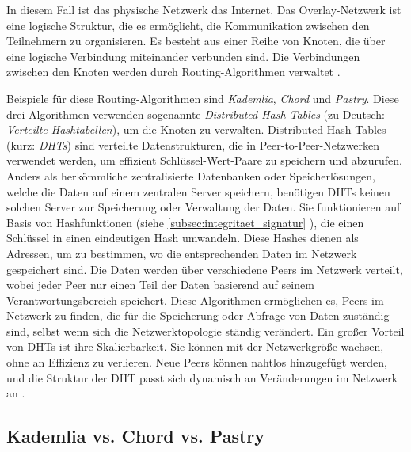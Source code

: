 \noindent In diesem Fall ist das physische Netzwerk das Internet. Das Overlay-Netzwerk ist eine logische Struktur, die es ermöglicht, die Kommunikation zwischen den Teilnehmern zu organisieren. Es besteht aus einer Reihe von Knoten, die über eine logische Verbindung miteinander verbunden sind. Die Verbindungen zwischen den Knoten werden durch Routing-Algorithmen verwaltet \parencite{Lua_P2POverlayNetworksPaper}.

Beispiele für diese Routing-Algorithmen sind \textit{Kademlia}, \textit{Chord} und \textit{Pastry}. Diese drei Algorithmen verwenden sogenannte \textit{Distributed Hash Tables} (zu Deutsch: \textit{Verteilte Hashtabellen}), um die Knoten zu verwalten. Distributed Hash Tables (kurz: \textit{DHTs}) sind verteilte Datenstrukturen, die in Peer-to-Peer-Netzwerken verwendet werden, um effizient Schlüssel-Wert-Paare zu speichern und abzurufen. Anders als herkömmliche zentralisierte Datenbanken oder Speicherlösungen, welche die Daten auf einem zentralen Server speichern, benötigen DHTs keinen solchen Server zur Speicherung oder Verwaltung der Daten. Sie funktionieren auf Basis von Hashfunktionen (siehe \ref{subsec:integritaet_signatur} \textit{}), die einen Schlüssel in einen eindeutigen Hash umwandeln. Diese Hashes dienen als Adressen, um zu bestimmen, wo die entsprechenden Daten im Netzwerk gespeichert sind. Die Daten werden über verschiedene Peers im Netzwerk verteilt, wobei jeder Peer nur einen Teil der Daten basierend auf seinem Verantwortungsbereich speichert. Diese Algorithmen ermöglichen es, Peers im Netzwerk zu finden, die für die Speicherung oder Abfrage von Daten zuständig sind, selbst wenn sich die Netzwerktopologie ständig verändert. Ein großer Vorteil von DHTs ist ihre Skalierbarkeit. Sie können mit der Netzwerkgröße wachsen, ohne an Effizienz zu verlieren. Neue Peers können nahtlos hinzugefügt werden, und die Struktur der DHT passt sich dynamisch an Veränderungen im Netzwerk an \parencites{Stoica_Chord}{Rowstron_Pastry}{Maymounkov_Kademlia}[S. 43-46]{Balakrishnan_LookingUpDataInP2PSystems}.


\subsection{Kademlia vs. Chord vs. Pastry}

